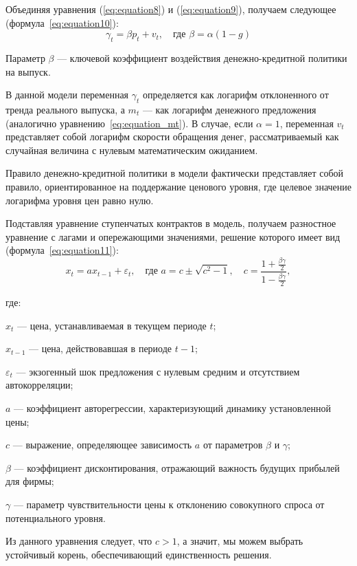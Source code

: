 Объединяя уравнения (\ref{eq:equation8}) и (\ref{eq:equation9}), получаем следующее (формула~\eqref{eq:equation10}):
\begin{equation}
	\label{eq:equation10}
	\gamma_t = \beta p_t + v_t, \quad \text{где } \beta = \alpha(1 - g)
\end{equation}

Параметр \( \beta \) — ключевой коэффициент воздействия денежно-кредитной политики на выпуск.

В данной модели переменная \( \gamma_t \) определяется как логарифм отклоненного от тренда реального выпуска, а \( m_t \) — как логарифм денежного предложения (аналогично уравнению~\eqref{eq:equation_mt}). В случае, если \( \alpha = 1 \), переменная \( v_t \) представляет собой логарифм скорости обращения денег, рассматриваемый как случайная величина с нулевым математическим ожиданием.

Правило денежно-кредитной политики в модели фактически представляет собой правило, ориентированное на поддержание ценового уровня, где целевое значение логарифма уровня цен равно нулю.

Подставляя уравнение ступенчатых контрактов в модель, получаем разностное уравнение с лагами и опережающими значениями, решение которого имеет вид (формула~\eqref{eq:equation11}):
\begin{equation}
	\label{eq:equation11}
	x_t = a x_{t-1} + \varepsilon_t,
	\quad \text{где } a = c \pm \sqrt{c^2 - 1}, \quad
	c = \frac{1 + \frac{\beta \gamma}{2}}{1 - \frac{\beta \gamma}{2}},
\end{equation}

где:
\par
$x_t$ — цена, устанавливаемая в текущем периоде $t$;
\par
$x_{t-1}$ — цена, действовавшая в периоде $t{-}1$;
\par
$\varepsilon_t$ — экзогенный шок предложения с нулевым средним и отсутствием автокорреляции;
\par
$a$ — коэффициент авторегрессии, характеризующий динамику установленной цены;
\par
$c$ — выражение, определяющее зависимость $a$ от параметров $\beta$ и $\gamma$;
\par
$\beta$ — коэффициент дисконтирования, отражающий важность будущих прибылей для фирмы;
\par
$\gamma$ — параметр чувствительности цены к отклонению совокупного спроса от потенциального уровня.

Из данного уравнения следует, что \( c > 1 \), а значит, мы можем выбрать устойчивый корень, обеспечивающий единственность решения.

